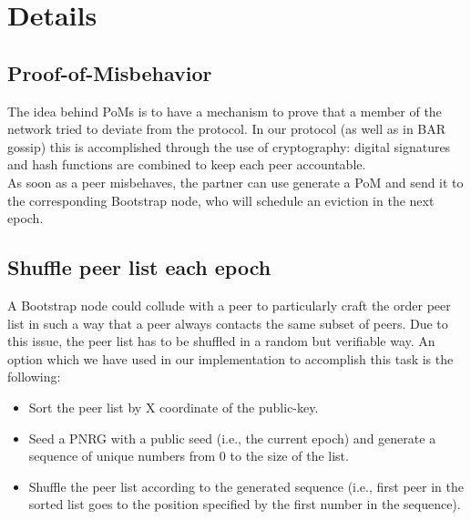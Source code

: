 \documentclass[mscthesis]{usiinfthesis}
\begin{document}
\begin{table}[H]
\centering
{}
\caption{Key message description}
\label{tab:key-bar-message}
\end{table}

\section{Details}
\subsection{Proof-of-Misbehavior}
The idea behind PoMs is to have a mechanism to prove that a member of the network tried to deviate from the protocol. In our protocol (as well as in BAR gossip) this is accomplished through the use of cryptography: digital signatures and hash functions are combined to keep each peer accountable.\\
 As soon as a peer misbehaves, the partner can use generate a PoM and send it to the corresponding Bootstrap node, who will schedule an eviction in the next epoch.

\subsection{Shuffle peer list each epoch}
A Bootstrap node could collude with a peer to particularly craft the order peer list in such a way that a peer always contacts the same subset of peers. Due to this issue, the peer list has to be shuffled in a random but verifiable way.  An option which we have used in our implementation to accomplish this task is the following:
\begin{itemize}
	\item Sort the peer list by X coordinate of the public-key.
	\item Seed a PNRG with a public seed (i.e., the current epoch) and generate a sequence of unique numbers from 0 to the size of the list.
	\item Shuffle the peer list according to the generated sequence (i.e., first peer in the sorted list goes to the position specified by the first number in the sequence).
\end{itemize}
\end{document}
